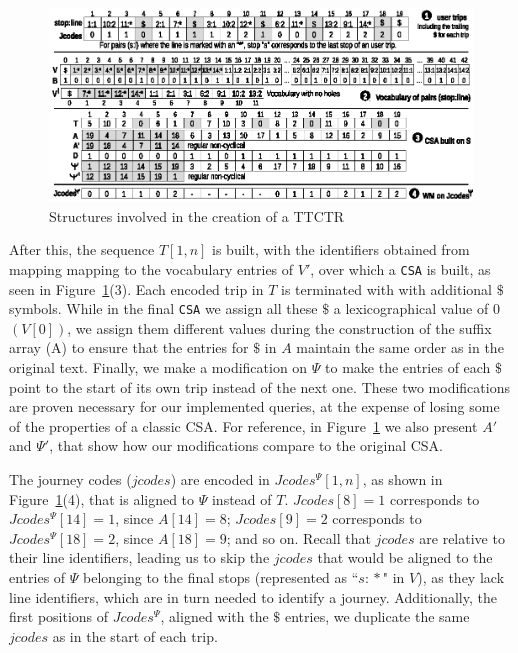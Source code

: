 \documentclass[runningheads]{llncs}
\newcommand{\ttctr}{TTCTR}
\begin{document}
\begin{figure}
    \includegraphics[width=1.00\textwidth]{ttctr2019.eps}
	\caption{Structures involved in the creation of a \ttctr}
	\label{fig:ttctr}
\end{figure}

After this, the sequence $T[1,n]$ is built, with the identifiers obtained from mapping mapping to the vocabulary entries of $V'$, over which a \texttt{CSA} is built, as seen in Figure~\ref{fig:ttctr}(3). Each encoded trip in $T$ is terminated with with additional $\$$ symbols. While in the final \texttt{CSA} we assign all these $\$$ a lexicographical value of 0 $(V[0])$, we assign them different values during the construction of the suffix array (A) to ensure that the entries for $\$$ in $A$ maintain the same order as in the original text. Finally, we make a modification on $\Psi$ to make the entries of each $\$$ point to the start of its own trip instead of the next one. These two modifications are proven necessary for our implemented queries, at the expense of losing some of the properties of a classic CSA. For reference, in Figure~\ref{fig:ttctr} we also present $A'$ and $\Psi'$, that show how our modifications compare to the original CSA.

The journey codes ($jcodes$) are encoded in $Jcodes^{\Psi}[1,n]$, as shown in Figure~\ref{fig:ttctr}(4), that is aligned to $\Psi$ instead of $T$. $Jcodes[8]= 1$ corresponds to $Jcodes^{\Psi}[14]=1$, since $A[14]=8$; $Jcodes[9]= 2$ corresponds to $Jcodes^{\Psi}[18]=2$, since $A[18]=9$; and so on. Recall that $jcodes$ are relative to their line identifiers, leading us to skip the $jcodes$ that would be aligned to the entries of $\Psi$ belonging to the final stops (represented as ``$s\!:\!*$" in $V$), as they lack line identifiers, which are in turn needed to identify a journey. Additionally, the first positions of $Jcodes^{\Psi}$, aligned with the $\$$ entries, we duplicate the same $jcodes$ as in the start of each trip.
\end{document}

